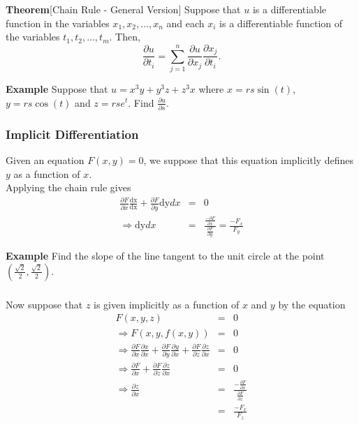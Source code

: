 \begin{frame}[fragile]\frametitle{}
\textbf{Theorem}[Chain Rule - General Version]
Suppose that $u$ is a differentiable function in the variables $x_1,x_2,\dots, x_n$ and each $x_i$ is a differentiable function of the variables $t_1,t_2,\dots,t_m$.  Then,
$$
\frac{\partial u}{\partial t_i} = \sum_{j=1}^n \frac{\partial u}{\partial x_j} \frac{\partial x_j}{\partial t_i}.
$$
  

\textbf{Example}
Suppose that $u=x^3y+y^3z +z^3x$ where $x=rs\sin(t)$, $y=rs\cos(t)$ and $z=rse^t$.  Find $\frac{\partial u}{\partial s}$. 

\end{frame}



\begin{frame}[fragile]\frametitle{Implicit Differentiation}
Given an equation $F(x,y)=0$, we suppose that this equation implicitly defines $y$ as a function of $x$.  \\ 
Applying the chain rule gives 
\begin{eqnarray*}
 \frac{\partial F}{\partial x} \frac{\text{dx}}{\text{dx}} + \frac{\partial F}{\partial y}\text{dy}dx  &=& 0\\  
  \Rightarrow  \text{dy}dx &=& \frac{\frac{-\partial F}{\partial x}}{\frac{\partial F}{\partial y}} =\frac{-F_x}{F_y}
\end{eqnarray*}  

\textbf{Example}
Find the slope of the line tangent to the unit circle at the point $(\frac{\sqrt{2}}{2}, \frac{\sqrt{2}}{2})$.

\end{frame}


\begin{frame}[fragile]\frametitle{}
Now suppose that $z$ is given implicitly as a function of $x$ and $y$ by the equation 
\begin{eqnarray*}
F(x,y,z)&=&0  \\ 
\Rightarrow F(x,y,f(x,y))&=&0 \\  
\Rightarrow  \frac{\partial F}{\partial x} \frac{\partial x}{\partial x} + \frac{\partial F}{\partial y}\frac{\partial y}{\partial x}  
                                                      +  \frac{\partial F}{\partial z} \frac{\partial z}{\partial x} &=& 0\\  
    \Rightarrow  \frac{\partial F}{\partial x}   +  \frac{\partial F}{\partial z} \frac{\partial z}{\partial x} &=& 0\\  
    \Rightarrow  \frac{\partial z}{\partial x} &=& \frac{-  \frac{\partial F}{\partial x}}{\frac{\partial F}{\partial z}}  \\
                                                                 &=&\frac{-F_x}{F_z}                    
\end{eqnarray*}  
\end{frame}


